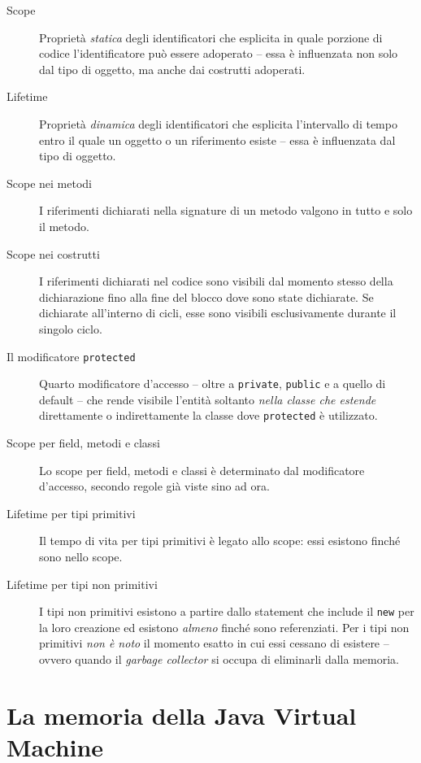 \documentclass[\fontsizeclass,twocolumn]{\classname}
\theoremstyle{definition}
\theoremstyle{definition}
\begin{document}
\begin{description}
    \item[Scope] Proprietà \emph{statica} degli identificatori che esplicita in quale porzione di codice l'identificatore può essere adoperato -- essa è influenzata non solo dal tipo di oggetto, ma anche dai costrutti adoperati.
    \item[Lifetime] Proprietà \emph{dinamica} degli identificatori che esplicita l'intervallo di tempo entro il quale un oggetto o un riferimento esiste -- essa è influenzata dal tipo di oggetto.
    \item[Scope nei metodi] I riferimenti dichiarati nella signature di un metodo valgono in tutto e solo il metodo.
    \item[Scope nei costrutti] I riferimenti dichiarati nel codice sono visibili dal momento stesso della dichiarazione fino alla fine del blocco dove sono state dichiarate. Se dichiarate all'interno di cicli, esse sono visibili esclusivamente durante il singolo ciclo.
    \item[Il modificatore \texttt{protected}] Quarto modificatore d'accesso -- oltre a \texttt{private}, \texttt{public} e a quello di default -- che rende visibile l'entità soltanto \emph{nella classe che estende} direttamente o indirettamente la classe dove \texttt{protected} è utilizzato.
    \item[Scope per field, metodi e classi] Lo scope per field, metodi e classi è determinato dal modificatore d'accesso, secondo regole già viste sino ad ora.
    \item[Lifetime per tipi primitivi] Il tempo di vita per tipi primitivi è legato allo scope: essi esistono finché sono nello scope.
    \item[Lifetime per tipi non primitivi] I tipi non primitivi esistono a partire dallo statement che include il \texttt{new} per la loro creazione ed esistono \emph{almeno} finché sono referenziati. Per i tipi non primitivi \emph{non è noto} il momento esatto in cui essi cessano di esistere -- ovvero quando il \emph{garbage collector} si occupa di eliminarli dalla memoria.
\end{description}


\chapter{La memoria della Java Virtual Machine}
\end{document}
